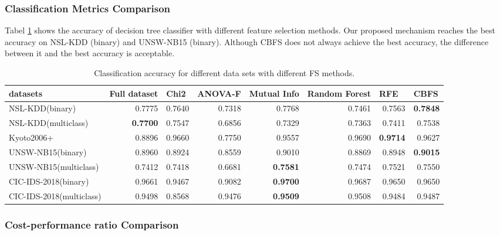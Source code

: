 \documentclass{ieeeaccess}
\theoremstyle{definition}
\begin{document}
\subsubsection{Classification Metrics Comparison}

Tabel \ref{tab:accuracy} shows the accuracy of decision tree classifier with different feature selection methods. Our proposed mechanism reaches the best accuracy on NSL-KDD (binary) and UNSW-NB15 (binary). Although CBFS does not always achieve the best accuracy, the difference between it and the best accuracy is acceptable.

\begin{table}[htbp]
    \centering
    \caption{Classification accuracy for different data sets with different FS methods.}
    \begin{tabular}{lrrrrrrr}
        \toprule
        datasets & \multicolumn{1}{l}{Full dataset} & \multicolumn{1}{l}{Chi2} & \multicolumn{1}{l}{ANOVA-F} & \multicolumn{1}{l}{Mutual Info} & \multicolumn{1}{l}{Random Forest} & \multicolumn{1}{l}{RFE} & \multicolumn{1}{l}{CBFS} \\
        \midrule
        NSL-KDD(binary) & 0.7775  & 0.7640  & 0.7318  & 0.7768  & 0.7461  & 0.7563  & \textbf{0.7848} \\
        NSL-KDD(multiclass) & \textbf{0.7700} & 0.7547  & 0.6856  & 0.7329  & 0.7363  & 0.7411  & 0.7538  \\
        Kyoto2006+ & 0.8896  & 0.9660  & 0.7750  & 0.9557  & 0.9690  & \textbf{0.9714} & 0.9627  \\
        UNSW-NB15(binary) & 0.8960  & 0.8924  & 0.8559  & 0.9010  & 0.8869  & 0.8948  & \textbf{0.9015} \\
        UNSW-NB15(multiclass) & 0.7412  & 0.7418  & 0.6681  & \textbf{0.7581} & 0.7474  & 0.7521  & 0.7550  \\
        CIC-IDS-2018(binary) & 0.9661  & 0.9467  & 0.9082  & \textbf{0.9700} & 0.9687  & 0.9650  & 0.9650  \\
        CIC-IDS-2018(multiclass) & 0.9498  & 0.8568  & 0.9476  & \textbf{0.9509} & 0.9508  & 0.9484  & 0.9487  \\
        \bottomrule
    \end{tabular}%
    \label{tab:accuracy}%
\end{table}%

\subsubsection{Cost-performance ratio Comparison}
\end{document}
